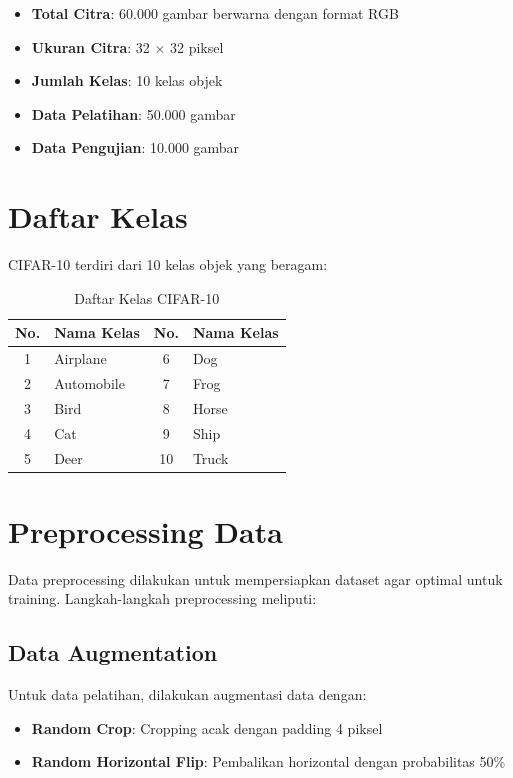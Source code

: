 \documentclass[12pt,a4paper]{report}
\begin{document}
\begin{itemize}
    \item \textbf{Total Citra}: 60.000 gambar berwarna dengan format RGB
    \item \textbf{Ukuran Citra}: 32 × 32 piksel
    \item \textbf{Jumlah Kelas}: 10 kelas objek
    \item \textbf{Data Pelatihan}: 50.000 gambar
    \item \textbf{Data Pengujian}: 10.000 gambar
\end{itemize}

\section{Daftar Kelas}

CIFAR-10 terdiri dari 10 kelas objek yang beragam:

\begin{table}[H]
\centering
\caption{Daftar Kelas CIFAR-10}
\begin{tabular}{|c|l|c|l|}
\hline
\textbf{No.} & \textbf{Nama Kelas} & \textbf{No.} & \textbf{Nama Kelas} \\
\hline
1 & Airplane & 6 & Dog \\
\hline
2 & Automobile & 7 & Frog \\
\hline
3 & Bird & 8 & Horse \\
\hline
4 & Cat & 9 & Ship \\
\hline
5 & Deer & 10 & Truck \\
\hline
\end{tabular}
\end{table}

\section{Preprocessing Data}

Data preprocessing dilakukan untuk mempersiapkan dataset agar optimal untuk training. Langkah-langkah preprocessing meliputi:

\subsection{Data Augmentation}

Untuk data pelatihan, dilakukan augmentasi data dengan:
\begin{itemize}
    \item \textbf{Random Crop}: Cropping acak dengan padding 4 piksel
    \item \textbf{Random Horizontal Flip}: Pembalikan horizontal dengan probabilitas 50\%
\end{itemize}
\end{document}
